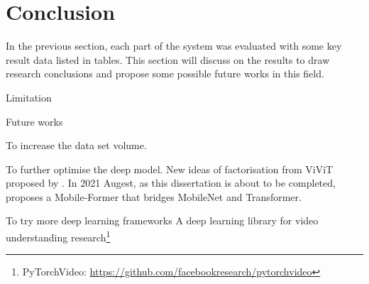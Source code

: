 \chapter{Conclusion}
\label{chap:Conclusion}
In the previous section, each part of the system was evaluated with some key result data listed in tables.
This section will discuss on the results to draw research conclusions and propose some possible future works in this field.

Limitation

Future works

To increase the data set volume.

To further optimise the deep model.
New ideas of factorisation from ViViT proposed by \citet{arnab2021vivit}.
In 2021 Augest, as this dissertation is about to be completed, \citet{chen2021mobileformer} proposes a Mobile-Former that bridges MobileNet and Transformer.

To try more deep learning frameworks
A deep learning library for video understanding research\footnote{PyTorchVideo: \url{https://github.com/facebookresearch/pytorchvideo}}
